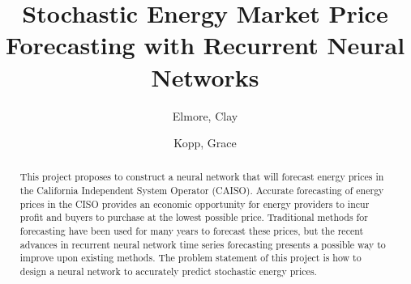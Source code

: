 \documentclass[sigconf]{acmart}
\begin{document}
%

%
\title{Stochastic Energy Market Price Forecasting with Recurrent Neural Networks}

%

\author{Elmore, Clay}

\author{Kopp, Grace}
%
\renewcommand{\shortauthors}{Elmore and Kopp, et al.}


\begin{abstract}
This project proposes to construct a neural network that will forecast energy prices in the California Independent System Operator (CAISO). Accurate forecasting of energy prices in the CISO provides an economic opportunity for energy providers to incur profit and buyers to purchase at the lowest possible price. Traditional methods for forecasting have been used for many years to forecast these prices, but the recent advances in recurrent neural network time series forecasting presents a possible way to improve upon existing methods. The problem statement of this project is how to design a neural network to accurately predict stochastic energy prices.
\end{abstract}
\end{document}
